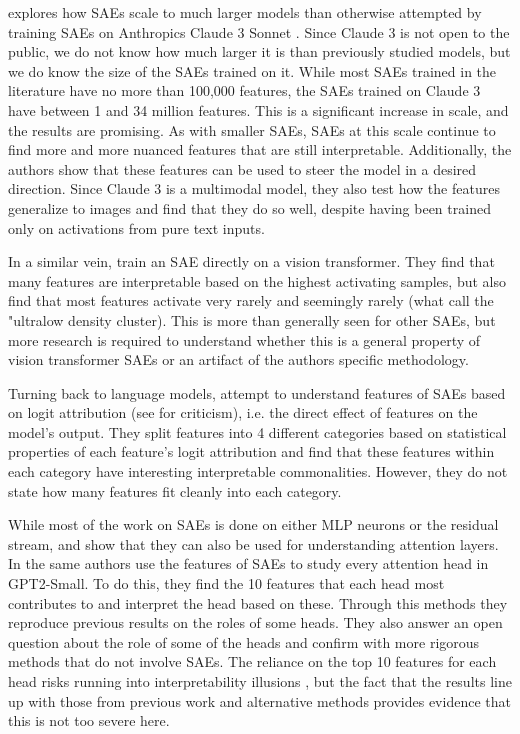 \documentclass[../../main.tex]{subfiles}
\begin{document}
\citet{templeton_scaling_2024} explores how SAEs scale to much larger models than otherwise attempted by training SAEs on Anthropics Claude 3 Sonnet \citep{anthropic_introducing_nodate}.
Since Claude 3 is not open to the public, we do not know how much larger it is than previously studied models, but we do know the size of the SAEs trained on it.
While most SAEs trained in the literature have no more than 100,000 features, the SAEs trained on Claude 3 have between 1 and 34 million features.
This is a significant increase in scale, and the results are promising.
As with smaller SAEs, SAEs at this scale continue to find more and more nuanced features that are still interpretable.
Additionally, the authors show that these features can be used to steer the model in a desired direction.
Since Claude 3 is a multimodal model, they also test how the features generalize to images and find that they do so well, despite having been trained only on activations from pure text inputs.

In a similar vein, \citet{hugofry_towards_2024} train an SAE directly on a vision transformer.
They find that many features are interpretable based on the highest activating samples, but also find that most features activate very rarely and seemingly rarely (what \cite{bricken_towards_2023} call the "ultralow density cluster).
This is more than generally seen for other SAEs, but more research is required to understand whether this is a general property of vision transformer SAEs or an artifact of the authors specific methodology.

Turning back to language models, \citet{bloom_understanding_2024} attempt to understand features of SAEs based on logit attribution \citep{nostalgebraist_interpreting_2020} (see \citet{dao_adversarial_2023} for criticism), i.e. the direct effect of features on the model's output.
They split features into 4 different categories based on statistical properties of each feature's logit attribution and find that these features within each category have interesting interpretable commonalities.
However, they do not state how many features fit cleanly into each category.

While most of the work on SAEs is done on either MLP neurons or the residual stream, \citet{kissane_sparse_2024} and \citet{kissane_attention_2024} show that they can also be used for understanding attention layers.
In \citet{robertzk_we_2024} the same authors use the features of SAEs to study every attention head in GPT2-Small.
To do this, they find the 10 features that each head most contributes to and interpret the head based on these.
Through this methods they reproduce previous results on the roles of some heads.
They also answer an open question about the role of some of the heads and confirm with more rigorous methods that do not involve SAEs.
The reliance on the top 10 features for each head risks running into interpretability illusions \citep{bolukbasi_interpretability_2021}, but the fact that the results line up with those from previous work and alternative methods provides evidence that this is not too severe here. 
\end{document}
